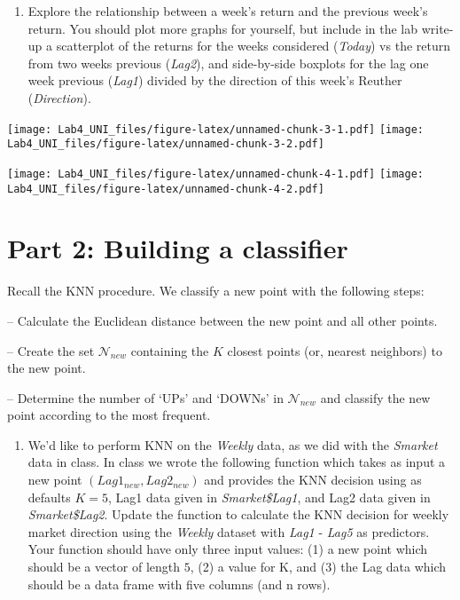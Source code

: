 \documentclass[]{article}
\providecommand{\tightlist}{%
  \setlength{\itemsep}{0pt}\setlength{\parskip}{0pt}}
\begin{document}
\begin{enumerate}
\def\labelenumi{\arabic{enumi}.}
\tightlist
\item
  Explore the relationship between a week's return and the previous
  week's return. You should plot more graphs for yourself, but include
  in the lab write-up a scatterplot of the returns for the weeks
  considered (\emph{Today}) vs the return from two weeks previous
  (\emph{Lag2}), and side-by-side boxplots for the lag one week previous
  (\emph{Lag1}) divided by the direction of this week's Reuther
  (\emph{Direction}).
\end{enumerate}

\texttt{[image: Lab4\_UNI\_files/figure-latex/unnamed-chunk-3-1.pdf]}
\texttt{[image: Lab4\_UNI\_files/figure-latex/unnamed-chunk-3-2.pdf]}

\texttt{[image: Lab4\_UNI\_files/figure-latex/unnamed-chunk-4-1.pdf]}
\texttt{[image: Lab4\_UNI\_files/figure-latex/unnamed-chunk-4-2.pdf]}

\hypertarget{part-2-building-a-classifier}{%
\section{Part 2: Building a
classifier}\label{part-2-building-a-classifier}}

Recall the KNN procedure. We classify a new point with the following
steps:

-- Calculate the Euclidean distance between the new point and all other
points.

-- Create the set \(\mathcal{N}_{new}\) containing the \(K\) closest
points (or, nearest neighbors) to the new point.

-- Determine the number of `UPs' and `DOWNs' in \(\mathcal{N}_{new}\)
and classify the new point according to the most frequent.

\begin{enumerate}
\def\labelenumi{\arabic{enumi}.}
\setcounter{enumi}{1}
\tightlist
\item
  We'd like to perform KNN on the \emph{Weekly} data, as we did with the
  \emph{Smarket} data in class. In class we wrote the following function
  which takes as input a new point \((Lag1_{new}, Lag2_{new})\) and
  provides the KNN decision using as defaults \(K=5\), Lag1 data given
  in \emph{Smarket\$Lag1}, and Lag2 data given in \emph{Smarket\$Lag2}.
  Update the function to calculate the KNN decision for weekly market
  direction using the \emph{Weekly} dataset with \emph{Lag1} -
  \emph{Lag5} as predictors. Your function should have only three input
  values: (1) a new point which should be a vector of length \(5\), (2)
  a value for K, and (3) the Lag data which should be a data frame with
  five columns (and n rows).
\end{enumerate}
\end{document}
